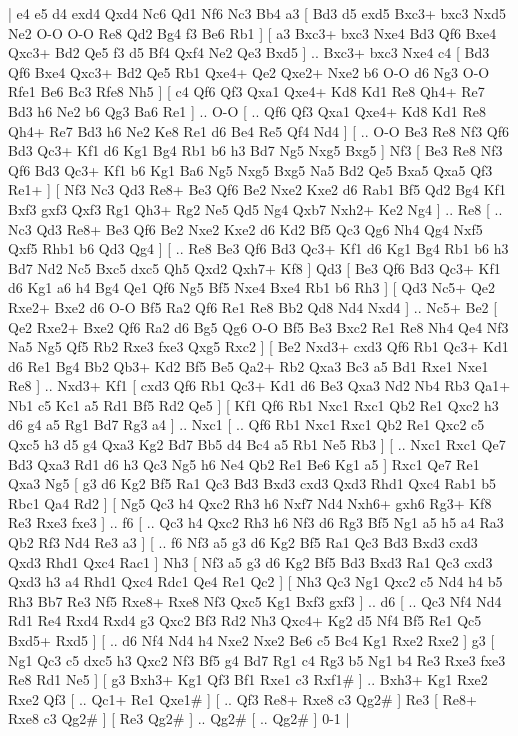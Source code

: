 \makegametitle 
|   e4   e5    d4   exd4    Qxd4   Nc6    Qd1   Nf6    Nc3   Bb4    a3 [  Bd3 d5  exd5 Bxc3+  bxc3 Nxd5  Ne2 O-O  O-O Re8  Qd2 Bg4  f3 Be6  Rb1   ]  [  a3 Bxc3+  bxc3 Nxe4  Bd3 Qf6  Bxe4 Qxc3+  Bd2 Qe5  f3 d5  Bf4 Qxf4  Ne2 Qe3  Bxd5   ] .. Bxc3+    bxc3   Nxe4    c4 [  Bd3 Qf6  Bxe4 Qxc3+  Bd2 Qe5  Rb1 Qxe4+  Qe2 Qxe2+  Nxe2 b6  O-O d6  Ng3 O-O  Rfe1 Be6  Bc3 Rfe8  Nh5   ]  [  c4 Qf6  Qf3 Qxa1  Qxe4+ Kd8  Kd1 Re8  Qh4+ Re7  Bd3 h6  Ne2 b6  Qg3 Ba6  Re1   ] .. O-O [ .. Qf6  Qf3 Qxa1  Qxe4+ Kd8  Kd1 Re8  Qh4+ Re7  Bd3 h6  Ne2 Ke8  Re1 d6  Be4 Re5  Qf4 Nd4   ]  [ .. O-O  Be3 Re8  Nf3 Qf6  Bd3 Qc3+  Kf1 d6  Kg1 Bg4  Rb1 b6  h3 Bd7  Ng5 Nxg5  Bxg5   ]  Nf3 [  Be3 Re8  Nf3 Qf6  Bd3 Qc3+  Kf1 b6  Kg1 Ba6  Ng5 Nxg5  Bxg5 Na5  Bd2 Qe5  Bxa5 Qxa5  Qf3 Re1+   ]  [  Nf3 Nc3  Qd3 Re8+  Be3 Qf6  Be2 Nxe2  Kxe2 d6  Rab1 Bf5  Qd2 Bg4  Kf1 Bxf3  gxf3 Qxf3  Rg1 Qh3+  Rg2 Ne5  Qd5 Ng4  Qxb7 Nxh2+  Ke2 Ng4   ] .. Re8 [ .. Nc3  Qd3 Re8+  Be3 Qf6  Be2 Nxe2  Kxe2 d6  Kd2 Bf5  Qc3 Qg6  Nh4 Qg4  Nxf5 Qxf5  Rhb1 b6  Qd3 Qg4   ]  [ .. Re8  Be3 Qf6  Bd3 Qc3+  Kf1 d6  Kg1 Bg4  Rb1 b6  h3 Bd7  Nd2 Nc5  Bxc5 dxc5  Qh5 Qxd2  Qxh7+ Kf8   ]  Qd3 [  Be3 Qf6  Bd3 Qc3+  Kf1 d6  Kg1 a6  h4 Bg4  Qe1 Qf6  Ng5 Bf5  Nxe4 Bxe4  Rb1 b6  Rh3   ]  [  Qd3 Nc5+  Qe2 Rxe2+  Bxe2 d6  O-O Bf5  Ra2 Qf6  Re1 Re8  Bb2 Qd8  Nd4 Nxd4   ] .. Nc5+    Be2 [  Qe2 Rxe2+  Bxe2 Qf6  Ra2 d6  Bg5 Qg6  O-O Bf5  Be3 Bxc2  Re1 Re8  Nh4 Qe4  Nf3 Na5  Ng5 Qf5  Rb2 Rxe3  fxe3 Qxg5  Rxc2   ]  [  Be2 Nxd3+  cxd3 Qf6  Rb1 Qc3+  Kd1 d6  Re1 Bg4  Bb2 Qb3+  Kd2 Bf5  Be5 Qa2+  Rb2 Qxa3  Bc3 a5  Bd1 Rxe1  Nxe1 Re8   ] .. Nxd3+    Kf1 [  cxd3 Qf6  Rb1 Qc3+  Kd1 d6  Be3 Qxa3  Nd2 Nb4  Rb3 Qa1+  Nb1 c5  Kc1 a5  Rd1 Bf5  Rd2 Qe5   ]  [  Kf1 Qf6  Rb1 Nxc1  Rxc1 Qb2  Re1 Qxc2  h3 d6  g4 a5  Rg1 Bd7  Rg3 a4   ] .. Nxc1 [ .. Qf6  Rb1 Nxc1  Rxc1 Qb2  Re1 Qxc2  c5 Qxc5  h3 d5  g4 Qxa3  Kg2 Bd7  Bb5 d4  Bc4 a5  Rb1 Ne5  Rb3   ]  [ .. Nxc1  Rxc1 Qe7  Bd3 Qxa3  Rd1 d6  h3 Qc3  Ng5 h6  Ne4 Qb2  Re1 Be6  Kg1 a5   ]  Rxc1   Qe7    Re1   Qxa3    Ng5 [  g3 d6  Kg2 Bf5  Ra1 Qc3  Bd3 Bxd3  cxd3 Qxd3  Rhd1 Qxc4  Rab1 b5  Rbc1 Qa4  Rd2   ]  [  Ng5 Qc3  h4 Qxc2  Rh3 h6  Nxf7 Nd4  Nxh6+ gxh6  Rg3+ Kf8  Re3 Rxe3  fxe3   ] .. f6 [ .. Qc3  h4 Qxc2  Rh3 h6  Nf3 d6  Rg3 Bf5  Ng1 a5  h5 a4  Ra3 Qb2  Rf3 Nd4  Re3 a3   ]  [ .. f6  Nf3 a5  g3 d6  Kg2 Bf5  Ra1 Qc3  Bd3 Bxd3  cxd3 Qxd3  Rhd1 Qxc4  Rac1   ]  Nh3 [  Nf3 a5  g3 d6  Kg2 Bf5  Bd3 Bxd3  Ra1 Qc3  cxd3 Qxd3  h3 a4  Rhd1 Qxc4  Rdc1 Qe4  Re1 Qc2   ]  [  Nh3 Qc3  Ng1 Qxc2  c5 Nd4  h4 b5  Rh3 Bb7  Re3 Nf5  Rxe8+ Rxe8  Nf3 Qxc5  Kg1 Bxf3  gxf3   ] .. d6 [ .. Qc3  Nf4 Nd4  Rd1 Re4  Rxd4 Rxd4  g3 Qxc2  Bf3 Rd2  Nh3 Qxc4+  Kg2 d5  Nf4 Bf5  Re1 Qc5  Bxd5+ Rxd5   ]  [ .. d6  Nf4 Nd4  h4 Nxe2  Nxe2 Be6  c5 Bc4  Kg1 Rxe2  Rxe2   ]  g3 [  Ng1 Qc3  c5 dxc5  h3 Qxc2  Nf3 Bf5  g4 Bd7  Rg1 c4  Rg3 b5  Ng1 b4  Re3 Rxe3  fxe3 Re8  Rd1 Ne5   ]  [  g3 Bxh3+  Kg1 Qf3  Bf1 Rxe1  c3 Rxf1#   ] .. Bxh3+    Kg1  Rxe2    Rxe2   Qf3 [ .. Qc1+  Re1 Qxe1#   ]  [ .. Qf3  Re8+ Rxe8  c3 Qg2#   ]  Re3 [  Re8+ Rxe8  c3 Qg2#   ]  [  Re3 Qg2#   ] .. Qg2#    [ .. Qg2#   ] 0-1  |
